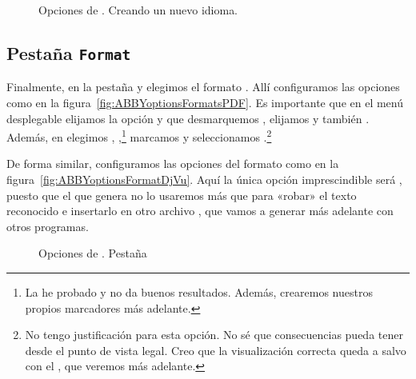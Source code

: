 \documentclass[%
	a5paper,
	10pt,
	twoside,
	openright,
	final,
]{memoir}
\begin{document}
	\begin{figure}
		\centering
		\caption{Opciones de \abby. Creando un nuevo idioma.}
	\end{figure}

	\subsection{Pestaña \texttt{Format}} Finalmente, en la pestaña  y elegimos el formato . Allí configuramos las opciones como en la figura~\ref{fig:ABBYoptionsFormatsPDF}. Es importante que en el menú desplegable  elijamos la opción  y que desmarquemos , elijamos  y también . Además, en  elegimos , ,\footnote{La he probado y no da buenos resultados. Además, crearemos nuestros propios marcadores más adelante.} marcamos  y seleccionamos .\footnote{No tengo justificación para esta opción. No sé que consecuencias pueda tener desde el punto de vista legal. Creo que la visualización correcta queda a salvo con el \pdfa, que veremos más adelante.}

	De forma similar, configuramos las opciones del formato \djvu como en la figura~\ref{fig:ABBYoptionsFormatDjVu}. Aquí la única opción imprescindible será , puesto que el \djvu que genera \abby no lo usaremos más que para «robar» el texto reconocido e insertarlo en otro archivo \djvu, que vamos a generar más adelante con otros programas.

	\begin{figure}
		\vspace{-20pt}
		\centering
		\caption[Opciones de \abby. Pestaña Format Settings >\ PDF]{Opciones de \abby. Pestaña \label{fig:ABBYoptionsFormatPDF}}
	\end{figure}
\end{document}

